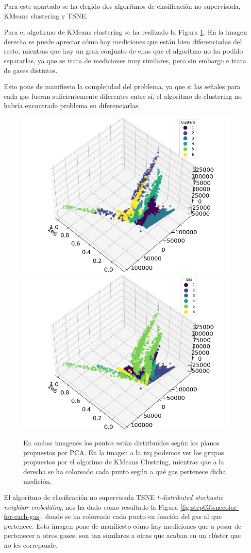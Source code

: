 Para este apartado se ha elegido dos algoritmos de clasificación no supervisada, KMeans clustering y TSNE. 

Para el algotirmo de KMeans clustering se ha realizado la Figura \ref{fig:step03color-for-each-cluster}. En la imagen derecha se puede apreciar cómo hay mediciones que están bien diferenciadas del resto, mientras que hay un gran conjunto de ellas que el algoritmo no ha podido separarlas, ya que se trata de mediciones muy similares, pero sin embargo e trata de gases distintos. 
	
Esto pone de manifiesto la complejidad del problema, ya que si las señales para cada gas fueran suficientemente diferentes entre sí, el algoritmo de clustering no habría encontrado problema en diferenciarlas. 

\begin{figure}[h!]
	\centering
	\includegraphics[width=0.45\linewidth]{"../py_imgs/Step0_3_Color for each cluster_3d_All data"}
	\includegraphics[width=0.45\linewidth]{"../py_imgs/Step0_3_Color for each gas_3d_All data"}
	\caption[Resultados KMeans Clustering]{En ambas imagenes los puntos están distribuidos según los planos propuestos por PCA. En la imagen a la izq podemos ver los grupos propuestos por el algorimo de KMeans Clusteing, mientras que a la derecha se ha coloreado cada punto según a qué gas pertenece dicha medición. }
	\label{fig:step03color-for-each-cluster}
\end{figure}


El algoritmo de clasificación no supervisada TSNE \emph{t-distributed stochastic neighbor embedding}, nos ha dado como resultado la Figura \ref{fig:step03tsnecolor-for-each-gas}, donde se ha coloreado cada punto en función del gas al que pertenece. Esta imagen pone de manifiesto cómo hay mediciones que a pesar de pertenecer a otros gases, son tan similares a otras que acaban en un clúster que no les correponde. 

